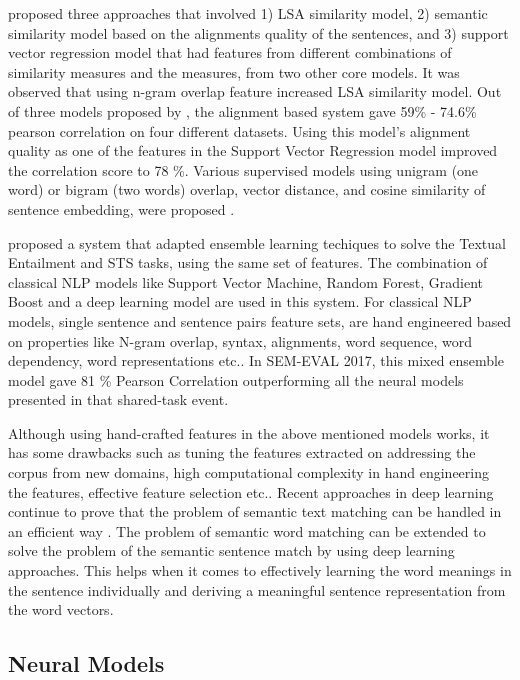 \documentclass[12pt]{report} %
\begin{document}
\cite{han2013umbc_ebiquity} proposed three approaches that involved 1) LSA similarity model, 2) semantic similarity model based on the alignments quality of the sentences, and 3) support vector regression model that had features from different combinations of similarity measures and the measures, from two other core models. It was observed that using n-gram overlap feature increased LSA similarity model. Out of three models proposed by \cite{han2013umbc_ebiquity}, the alignment based system gave 59\% - 74.6\% pearson correlation on four different datasets. Using this model's alignment quality as one of the features in the Support Vector Regression model improved the correlation score to 78 \%.  Various supervised models using unigram (one word) or bigram (two words) overlap, vector distance, and cosine similarity of sentence embedding, were proposed \citep{agirre2015semeval}.   

\cite{tian2017ecnu} proposed a system that adapted ensemble learning techiques to solve the Textual Entailment and STS tasks, using the same set of features. The combination of classical NLP models like Support Vector Machine, Random Forest, Gradient Boost and a deep learning model are used in this system. For classical NLP models, single sentence and sentence pairs feature sets, are hand engineered based on properties like N-gram overlap, syntax, alignments, word sequence, word dependency, word representations etc.. In SEM-EVAL 2017, this mixed ensemble model gave 81 \% Pearson Correlation outperforming all the neural models presented in that shared-task event.

Although using hand-crafted features in the above mentioned models works, it has some drawbacks such as tuning the features extracted on addressing the corpus from new domains, high computational complexity in hand engineering the features, effective feature selection etc.. Recent approaches in deep learning continue to prove that the problem of semantic text matching can be handled in an efficient way \citep{cer2017semeval}. The problem of semantic word matching can be extended to solve the problem of the semantic sentence match by using deep learning approaches. This helps when it comes to effectively learning the word meanings in the sentence individually and deriving a meaningful sentence representation from the word vectors.  

\subsection{Neural Models} 
\end{document}
